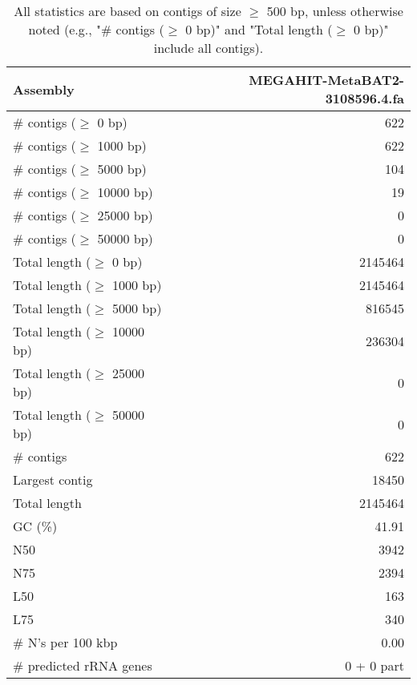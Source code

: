 \documentclass[12pt,a4paper]{article}
\begin{document}
\begin{table}[ht]
\begin{center}
\caption{All statistics are based on contigs of size $\geq$ 500 bp, unless otherwise noted (e.g., "\# contigs ($\geq$ 0 bp)" and "Total length ($\geq$ 0 bp)" include all contigs).}
\begin{tabular}{|l*{1}{|r}|}
\hline
Assembly & MEGAHIT-MetaBAT2-3108596.4.fa \\ \hline
\# contigs ($\geq$ 0 bp) & 622 \\ \hline
\# contigs ($\geq$ 1000 bp) & 622 \\ \hline
\# contigs ($\geq$ 5000 bp) & 104 \\ \hline
\# contigs ($\geq$ 10000 bp) & 19 \\ \hline
\# contigs ($\geq$ 25000 bp) & 0 \\ \hline
\# contigs ($\geq$ 50000 bp) & 0 \\ \hline
Total length ($\geq$ 0 bp) & 2145464 \\ \hline
Total length ($\geq$ 1000 bp) & 2145464 \\ \hline
Total length ($\geq$ 5000 bp) & 816545 \\ \hline
Total length ($\geq$ 10000 bp) & 236304 \\ \hline
Total length ($\geq$ 25000 bp) & 0 \\ \hline
Total length ($\geq$ 50000 bp) & 0 \\ \hline
\# contigs & 622 \\ \hline
Largest contig & 18450 \\ \hline
Total length & 2145464 \\ \hline
GC (\%) & 41.91 \\ \hline
N50 & 3942 \\ \hline
N75 & 2394 \\ \hline
L50 & 163 \\ \hline
L75 & 340 \\ \hline
\# N's per 100 kbp & 0.00 \\ \hline
\# predicted rRNA genes & 0 + 0 part \\ \hline
\end{tabular}
\end{center}
\end{table}
\end{document}
